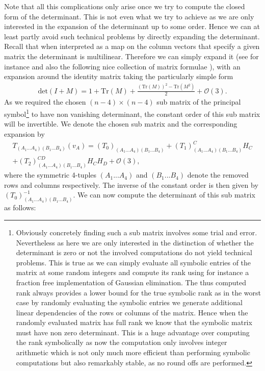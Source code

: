 \documentclass[a4paper,12pt, DIV=14, BCOR=5mm, twoside, headsepline, numbers=noenddot]{scrbook}
\begin{document}
Note that all this complications only arise once we try to compute the closed form of the determinant. This is not even what we try to achieve as we are only interested in the expansion of the determinant up to some order. Hence we can at least partly avoid such technical problems by directly expanding the determinant. Recall that when interpreted as a map on the column vectors that specify a given matrix the determinant is multilinear. Therefore we can simply expand it (see for instance \cite{2008CoTPh..49..801Z} and also the following nice collection of matrix formulae \cite{IMM2012-03274}), with an expansion around the identity matrix taking the particularly simple form 
\begin{align}\label{detExp}
    \mathrm{det}(I+M) = 1 + \mathrm{Tr}(M) + \frac{(\mathrm{Tr}(M))^2- \mathrm{Tr}(M^2)}{2} + \mathcal{O}(3). 
\end{align}
As we required the chosen $(n-4)\times (n-4)$ sub matrix of the principal symbol\footnote{Obviously concretely finding such a sub matrix involves some trial and error. Nevertheless as here we are only interested in the distinction of whether the determinant is zero or not the involved computations do not yield technical problems. This is true as we can simply evaluate all symbolic entries of the matrix at some random integers and compute its rank using for instance a fraction free implementation of Gaussian elimination. The thus computed rank always provides a lower bound for the true symbolic rank as in the worst case by randomly evaluating the symbolic entries we generate additional linear dependencies of the rows or columns of the matrix. Hence when the randomly evaluated matrix has full rank we know that the symbolic matrix must have non zero determinant. This is a huge advantage over computing the rank symbolically as now the computation only involves integer arithmetic which is not only much more efficient than performing symbolic computations but also remarkably stable, as no round offs are performed.} to have non vanishing determinant, the constant order of this sub matrix will be invertible. We denote the chosen sub matrix and the corresponding expansion by 
\begin{multline}
    T_{(A_1...A_4)(B_1...B_4)}(v_A) = (T_0)_{(A_1...A_4)(B_1...B_4)} + (T_1)_{(A_1...A_4)(B_1...B_4)}^{C} H_C \\
    +(T_2)_{(A_1...A_4)(B_1...B_4)}^{CD} H_C H_D + \mathcal{O}(3),
\end{multline}
where the symmetric 4-tuples $(A_1...A_4)$ and $(B_1...B_4)$ denote the removed rows and columns respectively. The inverse of the constant order is then given by $(T_0)^{-1}_{(A_1...A_4)(B_1...B_4)}$. We can now compute the determinant of this sub matrix as follows:
\end{document}

